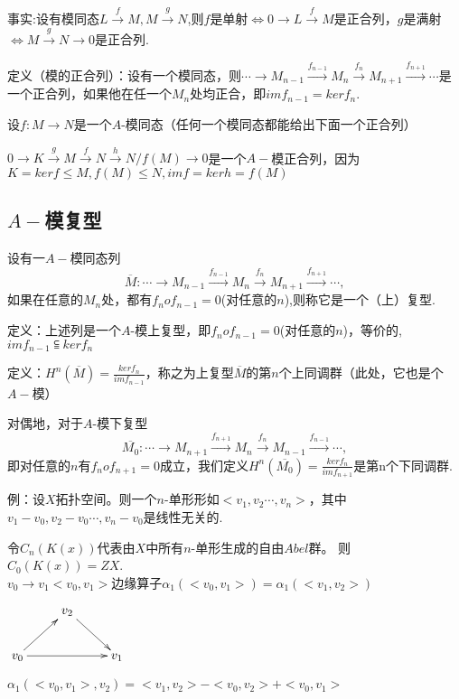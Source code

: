 \documentclass[UTF8]{article}
\begin{document}
事实:设有模同态$L\xrightarrow{f}M,M\xrightarrow{g}N$,则$f$是单射$\Leftrightarrow 0\rightarrow L\xrightarrow{f}M$是正合列，$g$是满射$\Leftrightarrow M\xrightarrow{g}N\rightarrow 0$是正合列.

定义（模的正合列）：设有一个模同态，则$\cdots\rightarrow M_{n-1}\xrightarrow{f_{n-1}}M_{n}\xrightarrow{f_{n}} M_{n+1}\xrightarrow{f_{n+1}}\cdots$是一个正合列，如果他在任一个$M_{n}$处均正合，即$imf_{n-1}=kerf_{n}$.

设$f:M\rightarrow N$是一个$A$-模同态（任何一个模同态都能给出下面一个正合列）

$0\rightarrow K\xrightarrow{g}M\xrightarrow{f}N\xrightarrow{h}N/f(M)\rightarrow 0$是一个$A-$模正合列，因为$K=kerf\leqslant M,f(M)\leqslant N,imf=kerh=f(M)$

\subsection{$A-$模复型}

设有一$A-$模同态列
$$\overline{M}:\cdots\rightarrow M_{n-1}\xrightarrow{f_{n-1}}M_{n}\xrightarrow{f_{n}} M_{n+1}\xrightarrow{f_{n+1}}\cdots,$$
如果在任意的$M_{n}$处，都有$f_{n}of_{n-1}=0$(对任意的$n$),则称它是一个（上）复型.

定义：上述列是一个$A$-模上复型，即$f_{n}of_{n-1}=0$(对任意的$n$)，等价的,$imf_{n-1}\subseteqq kerf_{n}$

定义：$H^{n}(\overline{M})=\frac{kerf_{n}}{imf_{n-1}}$，称之为上复型$\overline{M}$的第$n$个上同调群（此处，它也是个$A-$模）

对偶地，对于$A$-模下复型
$$\overline{M_{0}}:\cdots\rightarrow M_{n+1}\xrightarrow{f_{n+1}}M_{n}\xrightarrow{f_{n}} M_{n-1}\xrightarrow{f_{n-1}}\cdots,$$
即对任意的$n$有$f_{n}of_{n+1}=0$成立，我们定义$H^{n}(\overline{M_{0}})=\frac{kerf_{n}}{imf_{n+1}}$是第n个下同调群.

例：设$X$拓扑空间。则一个$n$-单形形如$<v_{1},v_{2}\cdots,v_{n}>$，其中$v_{1}-v_{0},v_{2}-v_{0}\cdots,v_{n}-v_{0}$是线性无关的.

令$C_{n}(K(x))$代表由$X$中所有$n$-单形生成的自由$Abel$群。
则$C_{0}(K(x))=ZX$.\\
$v_{0}\longrightarrow v_{1}$\qquad$<v_{0},v_{1}>$边缘算子\quad$\alpha_{1}(<v_{0},v_{1}>)=\alpha_{1}(<v_{1},v_{2}>)$

$\xymatrix{&v_{2}\ar[rd]&\\v_{0}\ar[ur]\ar[rr]& &v_{1}}$

\quad$\alpha_{1}(<v_{0},v_{1}>,v_{2})=<v_{1},v_{2}>-<v_{0},v_{2}>+<v_{0},v_{1}>$
\end{document}
